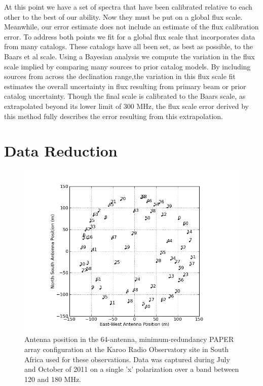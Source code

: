 \documentclass[preprint]{aastex}
\begin{document}
At this point we have a set of spectra that have been calibrated relative to each other to the best of our ability. Now 
they must be put on a global flux scale. Meanwhile, our error estimate does not include an estimate of the 
flux calibration error.  To address both points we fit for a global flux scale that incorporates data from many catalogs. These catalogs
have all been set, as best as possible, to the Baars et al scale.  Using a Bayesian analysis we compute the 
variation in the flux scale implied by comparing many sources to prior catalog models. By including sources from across
the declination range,the variation in this flux scale fit estimates the overall uncertainty in flux resulting from primary beam 
or prior catalog uncertainty.  Though the final scale is calibrated to the Baars scale, as extrapolated beyond its
lower limit of 300 MHz, the flux scale error derived by this method fully describes the error resulting from this extrapolation.

 
 \section{Data Reduction}
 \label{sec:Observations}


\begin{figure}\centering
\includegraphics[width=0.85\columnwidth]{plots/antpos.png}
\caption{Antenna position in the 64-antenna, minimum-redundancy PAPER array configuration at the Karoo Radio Observatory site in South Africa used for these observations.
Data was captured during July and October of 2011 on a single 'x' polarization over a band between 120 and 180 MHz.
}\label{fig:antpos}
\end{figure}
\end{document}

